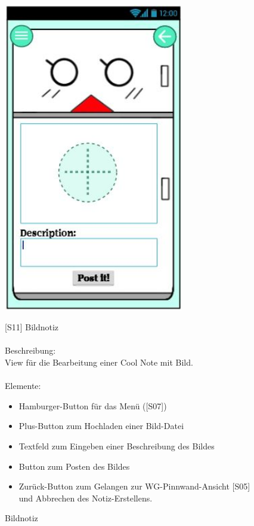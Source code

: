 \documentclass[a4paper]{scrreprt}
\begin{document}
    	\begin{figure}[h]
    		\begin{minipage}[b]{0.35\linewidth}
    			\flushright
    			\centering
    			\includegraphics[width=0.7\textwidth]{fridget_picnote.JPG}
    			\caption{Bildnotiz}
    			\label{fig:figure1}
    			\vspace{43mm}
    		\end{minipage}
    		\hspace{0.5cm}
    		\begin{minipage}[b]{0.65\linewidth}
    			\flushleft
    			{[}S11{]} Bildnotiz \\
    			\hfill
    			\\Beschreibung: \\
    			View für die Bearbeitung einer Cool Note mit
    			Bild.\\
    			
    			\hfill 
    			\\Elemente:
    			\begin{itemize}
    				\renewcommand\labelitemi{--}
    				\item Hamburger-Button für das Menü ({[}S07{]})
    				\item Plus-Button zum Hochladen einer Bild-Datei
    				\item Textfeld zum Eingeben einer Beschreibung des 
    				Bildes
    				\item Button zum Posten des Bildes
    				\item Zurück-Button zum Gelangen zur
    				WG-Pinnwand-Ansicht {[}S05{]} und Abbrechen des Notiz-Erstellens.
    				

\end{itemize}
\end{minipage}
\end{figure}
\end{document}
